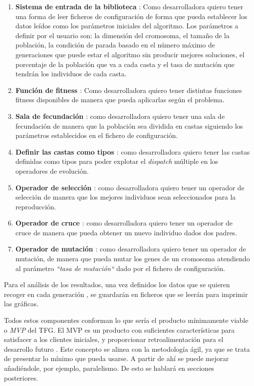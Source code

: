\begin{enumerate}
    \item \textbf{Sistema de entrada de la biblioteca} \label{it:sist_entrada}: Como desarrolladora quiero tener una forma de leer ficheros de configuración de forma que pueda
    establecer los datos leídos como los parámetros iniciales del algoritmo. Los parámetros a definir por el usuario son: la dimensión del cromosoma, el tamaño de la población, 
    la condición de parada basado en el número máximo de generaciones que puede estar el algoritmo sin producir mejores soluciones, el porcentaje de la población que va a cada casta y 
    el tasa de mutación que tendrán los individuos de cada casta.
    \item \textbf{Función de fitness \cite{project_repository_8}} \label{it:fitness_function}: Como desarrolladora quiero tener distintas funciones fitness disponibles de manera que pueda aplicarlas según 
    el problema.
    \item \textbf{Sala de fecundación \cite{project_repository_17}}: como desarrolladora quiero tener una sala de fecundación de manera que la población sea dividida en castas siguiendo los parámetros establecidos
    en el fichero de configuración.
    \item \textbf{Definir las castas como tipos \cite{project_repository_21}}: como desarrolladora quiero tener las castas definidas como tipos para poder explotar el \emph{dispatch} múltiple en los operadores de evolución.
    \item \textbf{Operador de selección \cite{project_repository_18}} \label{it:selection_operator}: como desarrolladora quiero tener un operador de selección de manera que los mejores individuos sean seleccionados para la reproducción.
    \item \textbf{Operador de cruce \cite{project_repository_19}} \label{it:crossover_operator}: como desarrolladora quiero tener un operador de cruce de manera que pueda obtener un nuevo individuo dados dos padres.
    \item \textbf{Operador de mutación \cite{project_repository_20}} \label{it:mutation_operator}: como desarrolladora quiero tener un operador de mutación, de manera que pueda mutar los genes de un cromosoma atendiendo al parámetro
    \emph{``tasa de mutación``} dado por el fichero de configuración. 
\end{enumerate}

Para el análisis de los resultados, una vez definidos los datos que se quieren recoger en cada generación \cite{pull_17}, 
se guardarán en ficheros que se leerán para imprimir las gráficas.

Todos estos componentes conforman lo que sería el producto mínimamente viable o \emph{MVP} del TFG. El MVP es un producto
con suficientes características para satisfacer a los clientes iniciales, y proporcionar retroalimentación para el desarrollo futuro \cite{mvp}. 
Este concepto se alinea con la metodología ágil, ya que se trata de presentar lo mínimo que pueda usarse. A partir de ahí se puede mejorar 
añadiéndole, por ejemplo, paralelismo. De esto se hablará en secciones posteriores.
